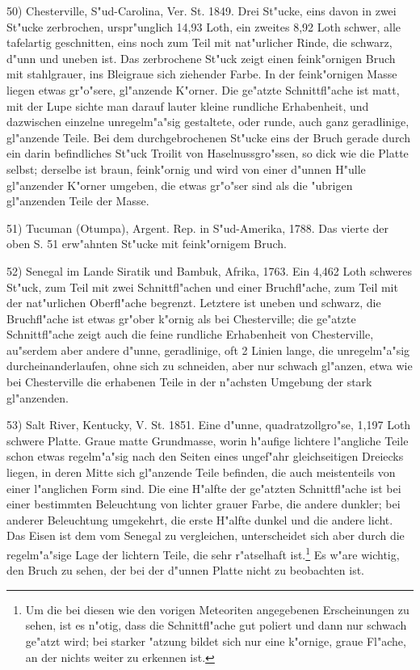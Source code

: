 \documentclass[a4paper, 11pt, oneside]{article}
\begin{document}
50) Chesterville, S"ud-Carolina, Ver. St. 1849. Drei St"ucke, eins davon in zwei St"ucke zerbrochen, urspr"unglich 14,93 Loth, ein zweites 8,92 Loth schwer, alle tafelartig geschnitten, eins noch zum Teil mit nat"urlicher Rinde, die schwarz, d"unn und uneben ist. Das zerbrochene St"uck zeigt einen feink"ornigen Bruch mit stahlgrauer, ins Bleigraue sich ziehender Farbe. In der feink"ornigen Masse liegen etwas gr"o"sere, gl"anzende K"orner. Die ge"atzte Schnittfl"ache ist matt, mit der Lupe sichte man darauf lauter kleine rundliche Erhabenheit, und dazwischen einzelne unregelm"a"sig gestaltete, oder runde, auch ganz geradlinige, gl"anzende Teile. Bei dem durchgebrochenen St"ucke eins der Bruch gerade durch ein darin befindliches St"uck Troilit von Haselnussgro"ssen, so dick wie die Platte selbst; derselbe ist braun, feink"ornig und wird von einer d"unnen H"ulle gl"anzender K"orner umgeben, die etwas gr"o"ser sind als die "ubrigen gl"anzenden Teile der Masse.

51) Tucuman (Otumpa), Argent. Rep. in S"ud-Amerika, 1788. Das vierte der oben S. 51 erw"ahnten St"ucke mit feink"ornigem Bruch.

52) Senegal im Lande Siratik und Bambuk, Afrika, 1763. Ein 4,462 Loth schweres St"uck, zum Teil mit zwei Schnittfl"achen und einer Bruchfl"ache, zum Teil mit der nat"urlichen Oberfl"ache begrenzt. Letztere ist uneben und schwarz, die Bruchfl"ache ist etwas gr"ober k"ornig als bei Chesterville; die ge"atzte Schnittfl"ache zeigt auch die feine rundliche Erhabenheit von Chesterville, au"serdem aber andere d"unne, geradlinige, oft 2 Linien lange, die unregelm"a"sig durcheinanderlaufen, ohne sich zu schneiden, aber nur schwach gl"anzen, etwa wie bei Chesterville die erhabenen Teile in der n"achsten Umgebung der stark gl"anzenden.

53) Salt River, Kentucky, V. St. 1851. Eine d"unne, quadratzollgro"se, 1,197 Loth schwere Platte. Graue matte Grundmasse, worin h"aufige lichtere l"angliche Teile schon etwas regelm"a"sig nach den Seiten eines ungef"ahr gleichseitigen Dreiecks liegen, in deren Mitte sich gl"anzende Teile befinden, die auch meistenteils von einer l"anglichen Form sind. Die eine H"alfte der ge"atzten Schnittfl"ache ist bei einer bestimmten Beleuchtung von lichter grauer Farbe, die andere dunkler; bei anderer Beleuchtung umgekehrt, die erste H"alfte dunkel und die andere licht. Das Eisen ist dem vom Senegal zu vergleichen, unterscheidet sich aber durch die regelm"a"sige Lage der lichtern Teile, die sehr r"atselhaft ist.\footnote{Um die bei diesen wie den vorigen Meteoriten angegebenen Erscheinungen zu sehen, ist es n"otig, dass die Schnittfl"ache gut poliert und dann nur schwach ge"atzt wird; bei starker "atzung bildet sich nur eine k"ornige, graue Fl"ache, an der nichts weiter zu erkennen ist.} Es w"are wichtig, den Bruch zu sehen, der bei der d"unnen Platte nicht zu beobachten ist.
\end{document}
